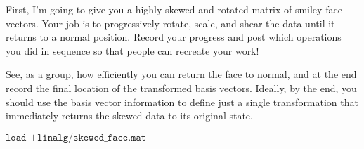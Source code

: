 \documentclass{ximera}
\begin{document}
\begin{exploration}

First, I'm going to give you a highly skewed and rotated matrix of smiley face vectors. Your job is to progressively rotate, scale, and shear the data until it returns to a normal position. Record your progress and post which operations you did in sequence so that people can recreate your work!

See, as a group, how efficiently you can return the face to normal, and at the end record the final location of the transformed basis vectors. Ideally, by the end, you should use the basis vector information to define just a single transformation that immediately returns the skewed data to its original state.

$\texttt{load +linalg/skewed\_face.mat}$

\end{exploration}
\end{document}
